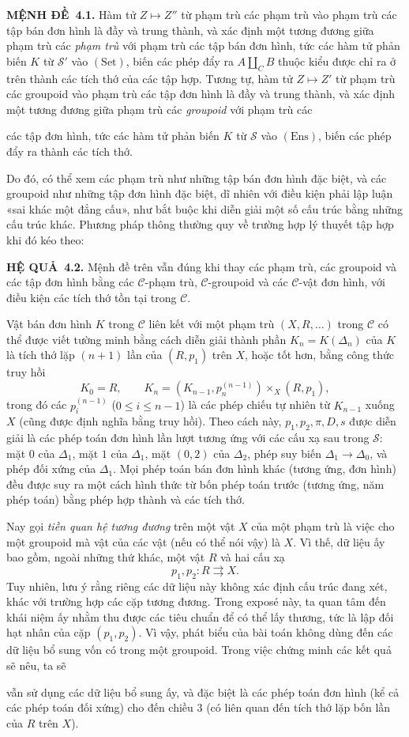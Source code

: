 \documentclass[11pt,twoside,openany]{book}
\numberwithin{equation}{section}
\newcommand{\src}[1]{%
  \phantomsection\hypertarget{src:\fgasourceid:#1}{}%
  \marginpar{\raggedleft\footnotesize\sffamily #1}%
}
\newcommand{\fgasourceid}{unset}
\newcommand{\result}[2]{\par\medskip\noindent\textbf{#1\if\relax\detokenize{#2}\relax\else\ #2\fi.}\quad}
\begin{document}
\result{MỆNH ĐỀ}{4.1} Hàm tử $Z\longmapsto Z''$ từ phạm trù các phạm trù vào
phạm trù các tập bán đơn hình là đầy và trung thành, và xác định một tương
đương giữa phạm trù các \emph{phạm trù} với phạm trù các tập bán đơn hình,
tức các hàm tử phản biến $K$ từ $\mathcal S'$ vào $(\mathrm{Set})$, biến các
phép đẩy ra $A\amalg_C B$ thuộc kiểu được chỉ ra ở trên thành các tích thớ của
các tập hợp. Tương tự, hàm tử $Z\longmapsto Z'$ từ phạm trù các groupoid vào
phạm trù các tập đơn hình là đầy và trung thành, và xác định một tương
đương giữa phạm trù các \emph{groupoid} với phạm trù các
\src{109}
các tập đơn hình, tức các hàm tử phản biến $K$ từ $\mathcal S$ vào
$(\mathrm{Ens})$, biến các phép đẩy ra thành các tích thớ.

Do đó, có thể xem các phạm trù như những tập bán đơn hình đặc biệt, và các
groupoid như những tập đơn hình đặc biệt, dĩ nhiên với điều kiện phải lập luận
«sai khác một đẳng cấu», như bắt buộc khi diễn giải một số cấu trúc bằng những
cấu trúc khác. Phương pháp thông thường quy về trường hợp lý thuyết tập hợp
khi đó kéo theo:

\result{HỆ QUẢ}{4.2} Mệnh đề trên vẫn đúng khi thay các phạm trù, các
groupoid và các tập đơn hình bằng các $\mathcal C$-phạm trù,
$\mathcal C$-groupoid và các $\mathcal C$-vật đơn hình, với điều kiện các tích
thớ tồn tại trong $\mathcal C$.

Vật bán đơn hình $K$ trong $\mathcal C$ liên kết với một phạm trù
$(X,R,\ldots)$ trong $\mathcal C$ có thể được viết tường minh bằng cách diễn
giải thành phần $K_n=K(\Delta_n)$ của $K$ là tích thớ lặp $(n+1)$ lần của
$(R,p_1)$ trên $X$, hoặc tốt hơn, bằng công thức truy hồi
\[
  K_0=R,\qquad
  K_n=(K_{n-1},p_n^{(n-1)})\times_X(R,p_1),
\]
trong đó các $p_i^{(n-1)}$ ($0\leq i\leq n-1$) là các phép chiếu tự nhiên từ
$K_{n-1}$ xuống $X$ (cũng được định nghĩa bằng truy hồi). Theo cách này,
$p_1,p_2,\pi,D,s$ được diễn giải là các phép toán đơn hình lần lượt tương ứng
với các cấu xạ sau trong $\mathcal S$: mặt $0$ của $\Delta_1$, mặt $1$ của
$\Delta_1$, mặt $(0,2)$ của $\Delta_2$, phép suy biến
$\Delta_1\to\Delta_0$, và phép đối xứng của $\Delta_1$. Mọi phép toán bán đơn
hình khác (tương ứng, đơn hình) đều được suy ra một cách hình thức từ bốn
phép toán trước (tương ứng, năm phép toán) bằng phép hợp thành và các tích thớ.

Nay gọi \emph{tiền quan hệ tương đương} trên một vật $X$ của một phạm trù là
việc cho một groupoid mà vật của các vật (nếu có thể nói vậy) là $X$. Vì thế,
dữ liệu ấy bao gồm, ngoài những thứ khác, một vật $R$ và hai cấu xạ
\[
  p_1,p_2:R\rightrightarrows X.
\]
Tuy nhiên, lưu ý rằng riêng các dữ liệu này không xác định cấu trúc đang xét,
khác với trường hợp các cặp tương đương. Trong exposé này, ta quan tâm đến
khái niệm ấy nhằm thu được các tiêu chuẩn để có thể lấy thương, tức là lập đối
hạt nhân của cặp $(p_1,p_2)$. Vì vậy, phát biểu của bài toán không dùng đến
các dữ liệu bổ sung vốn có trong một groupoid. Trong việc chứng minh các kết
quả sẽ nêu, ta sẽ
\src{110}
vẫn sử dụng các dữ liệu bổ sung ấy, và đặc biệt là các phép toán đơn hình
(kể cả các phép toán đối xứng) cho đến chiều $3$ (có liên quan đến tích thớ
lặp bốn lần của $R$ trên $X$).
\end{document}
